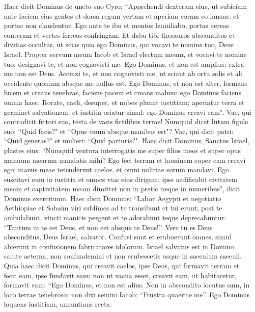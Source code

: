 \begin{biblechapter}  
\verse Haec dicit Dominus de uncto suo Cyro: “Apprehendi dexteram eius, ut subiciam ante faciem eius gentes et dorsa regum vertam et aperiam coram eo ianuas; et portae non claudentur. 
\verse Ego ante te ibo et montes humiliabo; portas aereas conteram et vectes ferreos confringam. 
\verse Et dabo tibi thesauros absconditos et divitias occultas, ut scias quia ego Dominus, qui vocavi te nomine tuo, Deus Israel. 
\verse Propter servum meum Iacob et Israel electum meum, et vocavi te nomine tuo; designavi te, et non cognovisti me. 
\verse Ego Dominus, et non est amplius: extra me non est Deus. Accinxi te, et non cognovisti me, 
\verse ut sciant ab ortu solis et ab occidente quoniam absque me nullus est. Ego Dominus, et non est alter, 
\verse formans lucem et creans tenebras, faciens pacem et creans malum: ego Dominus faciens omnia haec. 
\verse Rorate, caeli, desuper, et nubes pluant iustitiam; aperiatur terra et germinet salvationem; et iustitia oriatur simul: ego Dominus creavi eam". 
\verse Vae, qui contradicit fictori suo, testa de vasis fictilibus terrae! Numquid dicet lutum figulo suo: “Quid facis?" et “Opus tuum absque manibus est"? 
\verse Vae, qui dicit patri: “Quid generas?" et mulieri: “Quid parturis?". 
\verse Haec dicit Dominus, Sanctus Israel, plastes eius: “Numquid ventura interrogatis me super filios meos et super opus manuum mearum mandatis mihi? 
\verse Ego feci terram et hominem super eam creavi ego; manus meae tetenderunt caelos, et omni militiae eorum mandavi. 
\verse Ego suscitavi eum in iustitia et omnes vias eius dirigam; ipse aedificabit civitatem meam et captivitatem meam dimittet non in pretio neque in muneribus", dicit Dominus exercituum. 
\verse Haec dicit Dominus: “Labor Aegypti et negotiatio Aethiopiae et Sabaim viri sublimes ad te transibunt et tui erunt; post te ambulabunt, vincti manicis pergent et te adorabunt teque deprecabuntur: “Tantum in te est Deus, et non est absque te Deus!”. 
\verse Vere tu es Deus absconditus, Deus Israel, salvator. 
\verse Confusi sunt et erubuerunt omnes, simul abierunt in confusionem fabricatores idolorum. 
\verse Israel salvatus est in Domino salute aeterna; non confundemini et non erubescetis usque in saeculum saeculi. 
\verse Quia haec dicit Dominus, qui creavit caelos, ipse Deus, qui formavit terram et fecit eam, ipse fundavit eam; non ut vacua esset, creavit eam, ut habitaretur, formavit eam: “Ego Dominus, et non est alius. 
\verse Non in abscondito locutus sum, in loco terrae tenebroso; non dixi semini Iacob: “Frustra quaerite me”. Ego Dominus loquens iustitiam, annuntians recta. 

\end{biblechapter}
